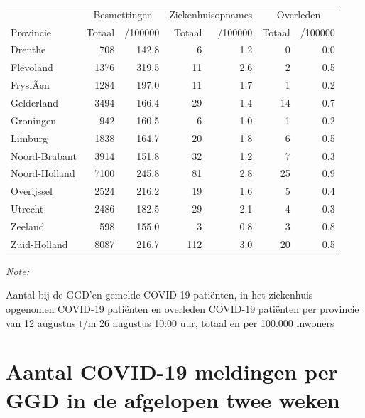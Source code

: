 \documentclass[
  english,
  man,floatsintext]{apa6}
\begin{document}
\begin{table}
\centering
\begin{threeparttable}
\begin{tabular}{lrrrrrr}
\toprule
\multicolumn{1}{c}{ } & \multicolumn{2}{c}{Besmettingen} & \multicolumn{2}{c}{Ziekenhuisopnames} & \multicolumn{2}{c}{Overleden} \\
\cmidrule(l{3pt}r{3pt}){2-3} \cmidrule(l{3pt}r{3pt}){4-5} \cmidrule(l{3pt}r{3pt}){6-7}
Provincie & Totaal & /100000 & Totaal & /100000 & Totaal & /100000\\
\midrule
Drenthe & 708 & 142.8 & 6 & 1.2 & 0 & 0.0\\
Flevoland & 1376 & 319.5 & 11 & 2.6 & 2 & 0.5\\
FryslÃ¢n & 1284 & 197.0 & 11 & 1.7 & 1 & 0.2\\
Gelderland & 3494 & 166.4 & 29 & 1.4 & 14 & 0.7\\
Groningen & 942 & 160.5 & 6 & 1.0 & 1 & 0.2\\
Limburg & 1838 & 164.7 & 20 & 1.8 & 6 & 0.5\\
Noord-Brabant & 3914 & 151.8 & 32 & 1.2 & 7 & 0.3\\
Noord-Holland & 7100 & 245.8 & 81 & 2.8 & 25 & 0.9\\
Overijssel & 2524 & 216.2 & 19 & 1.6 & 5 & 0.4\\
Utrecht & 2486 & 182.5 & 29 & 2.1 & 4 & 0.3\\
Zeeland & 598 & 155.0 & 3 & 0.8 & 3 & 0.8\\
Zuid-Holland & 8087 & 216.7 & 112 & 3.0 & 20 & 0.5\\
\bottomrule
\end{tabular}
\begin{tablenotes}
\item \textit{Note: } 
\item Aantal bij de GGD’en gemelde COVID-19 patiënten, in het ziekenhuis opgenomen COVID-19 patiënten en overleden COVID-19 patiënten per provincie van 12 augustus t/m 26 augustus 10:00 uur, totaal en per 100.000 inwoners
\end{tablenotes}
\end{threeparttable}
\end{table}

\newpage

\hypertarget{aantal-covid-19-meldingen-per-ggd-in-de-afgelopen-twee-weken}{%
\section{Aantal COVID-19 meldingen per GGD in de afgelopen twee weken}\label{aantal-covid-19-meldingen-per-ggd-in-de-afgelopen-twee-weken}}
\end{document}
